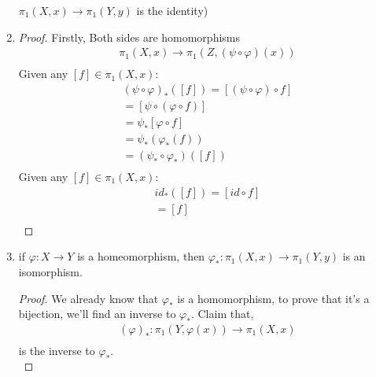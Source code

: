 \begin{enumerate}
\begin{definition}
                $\pi_{1}(X,x)\rightarrow \pi_{1}(Y,y)$ is the identity)
            \end{definition}
        \item \begin{proof}
                    Firstly, Both sides are homomorphisms
                        \begin{align*}
                            \pi_1(X,x)\rightarrow\pi_1(Z,(\psi\circ\varphi)(x))\\
                        \end{align*}
                    Given any $[f]\in\pi_1(X,x)$:
                        \begin{align*}
                            (\psi\circ\varphi)_{*}([f])=[(\psi\circ\varphi)\circ f]\\
                            =[\psi\circ(\varphi\circ f)]\\
                            =\psi_{*}[\varphi\circ f]\\
                            =\psi_{*}(\varphi_{*}(f))\\
                            =(\psi_{*}\circ\varphi_{*})([f])\\
                        \end{align*}
                    Given any $[f]\in\pi_1(X,x)$:
                        \begin{align*}
                            id_{*}([f])=[id\circ f]\\
                            =[f]\\
                        \end{align*}
        \end{proof}
        \item 
            \begin{theorem} if $\varphi: X\rightarrow Y$ is a homeomorphism,
            then $\varphi_{*}: \pi_{1}(X,x)\rightarrow\pi_{1}(Y,y)$ is an isomorphism.
            \end{theorem}
                \begin{proof}
                    We already know that $\varphi_{*}$ is a homomorphism, to prove that it's
                    a bijection, we'll find an inverse to $\varphi_{*}$. Claim that,
                    \begin{align*}
                        (\varphi)_{*}:\pi_1(Y,\varphi(x))\rightarrow\pi_1(X,x)\\
                    \end{align*}
                    is the inverse to $\varphi_{*}$.\\

\end{proof}
\end{enumerate}
